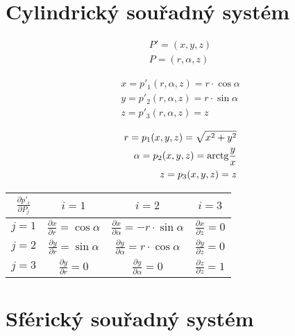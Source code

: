 \section{Cylindrický souřadný systém}

\begin{equation}
\begin{split}
P' = (x, y, z) \\
P = (r, \alpha, z)
\end{split}
\end{equation}

\begin{equation}
\begin{split}
x = p'_1(r, \alpha, z) = r \cdot \cos \alpha \\
y = p'_2(r, \alpha, z) = r \cdot \sin \alpha \\
z = p'_3(r, \alpha, z) = z
\end{split}
\end{equation}

\begin{equation}
\begin{split}
r = p_1(x, y, z) = \sqrt{x^2 + y^2} \\
\alpha = p_2(x, y, z) = \mathrm{arctg} \frac{y}{x} \\
z = p_3(x, y, z) = z
\end{split}
\end{equation}

\begin{tabular}{| c || c | c | c |}
\hline
\(\frac{\partial p'_i}{\partial P_j}\) & \(i=1\) & \(i=2\) & \(i=3\) \\
\hline
\hline
\(j=1\) & \(\frac{\partial x}{\partial r} = \cos \alpha\) & \(\frac{\partial x}{\partial \alpha} = -r \cdot \sin \alpha\) & \(\frac{\partial x}{\partial z} = 0\) \\
\hline
\(j=2\) & \(\frac{\partial y}{\partial r} = \sin \alpha\) & \(\frac{\partial y}{\partial \alpha} = r \cdot \cos \alpha\) & \(\frac{\partial y}{\partial z} = 0\) \\
\hline
\(j=3\) & \(\frac{\partial y}{\partial r} = 0\) & \(\frac{\partial y}{\partial \alpha} = 0\) & \(\frac{\partial z}{\partial z} = 1\) \\
\hline
\end{tabular}

\section{Sférický souřadný systém}

